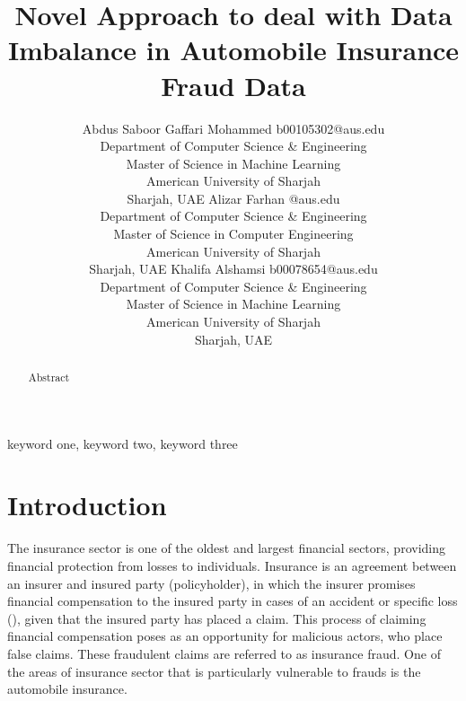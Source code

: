 \documentclass[twoside,11pt]{article}
\begin{document}
\title{Novel Approach to deal with Data Imbalance in Automobile Insurance Fraud Data}

\author{\name Abdus Saboor Gaffari Mohammed \email b00105302@aus.edu \\
        \addr Department of Computer Science \& Engineering\\
        Master of Science in Machine Learning\\
        American University of Sharjah\\
        Sharjah, UAE
        \AND
        \name Alizar Farhan \email @aus.edu \\
        \addr Department of Computer Science \& Engineering\\
        Master of Science in Computer Engineering\\
        American University of Sharjah\\
        Sharjah, UAE
        \AND
        \name Khalifa Alshamsi \email b00078654@aus.edu \\
        \addr Department of Computer Science \& Engineering\\
        Master of Science in Machine Learning\\
        American University of Sharjah\\
        Sharjah, UAE
       } 

\maketitle

\begin{abstract}%
Abstract
\end{abstract}

\begin{keywords}
  keyword one, keyword two, keyword three
\end{keywords}

\section{Introduction}
The insurance sector is one of the oldest and largest financial sectors, providing financial protection from losses to individuals. Insurance is an agreement between an insurer and insured party (policyholder), in which the insurer promises financial compensation to the insured party in cases of an accident or specific loss (\citealp{viaeneInsuranceFraudIssues2004}), given that the insured party has placed a claim. This process of claiming financial compensation poses as an opportunity for malicious actors, who place false claims. These fraudulent claims are referred to as insurance fraud. One of the areas of insurance sector that is particularly vulnerable to frauds is the automobile insurance.
\end{document}
